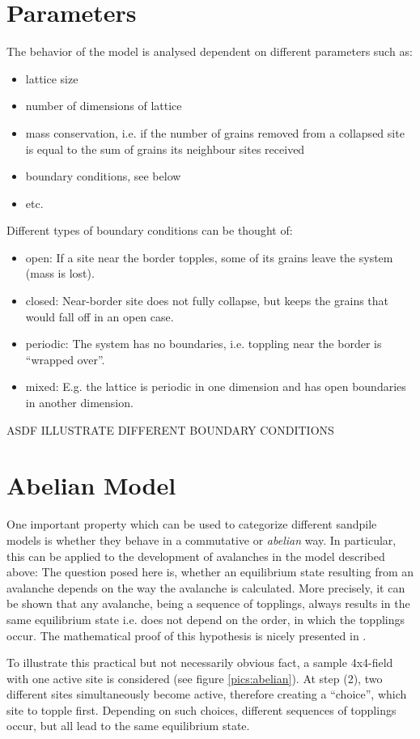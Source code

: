 \section{Parameters}
The behavior of the model is analysed dependent on different parameters such as:
\begin{itemize}
 \item lattice size
 \item number of dimensions of lattice
 \item mass conservation, i.e. if the number of grains removed from a collapsed site is equal to the sum of grains its neighbour sites received
 \item boundary conditions, see below
 \item etc.
\end{itemize}
Different types of boundary conditions can be thought of:
\begin{itemize}
 \item open: If a site near the border topples, some of its grains leave the system (mass is lost).
 \item closed: Near-border site does not fully collapse, but keeps the grains that would fall off in an open case.
 \item periodic: The system has no boundaries, i.e. toppling near the border is ``wrapped over''.
 \item mixed: E.g. the lattice is periodic in one dimension and has open boundaries in another dimension.
\end{itemize}
ASDF ILLUSTRATE DIFFERENT BOUNDARY CONDITIONS

\section{Abelian Model}
One important property which can be used to categorize different sandpile models is whether they behave in a commutative or \emph{abelian} way. In particular, this can be applied to the development of avalanches in the model described above: The question posed here is, whether an equilibrium state resulting from an avalanche depends on the way the avalanche is calculated. More precisely, it can be shown that any avalanche, being a sequence of topplings, always results in the same equilibrium state i.e. does not depend on the order, in which the topplings occur. The mathematical proof of this hypothesis is nicely presented in \cite{sandpile_math}.

To illustrate this practical but not necessarily obvious fact, a sample 4x4-field with one active site is considered (see figure \ref{pics:abelian}). At step (2), two different sites simultaneously become active, therefore creating a ``choice'', which site to topple first. Depending on such choices, different sequences of topplings occur, but all lead to the same equilibrium state.

